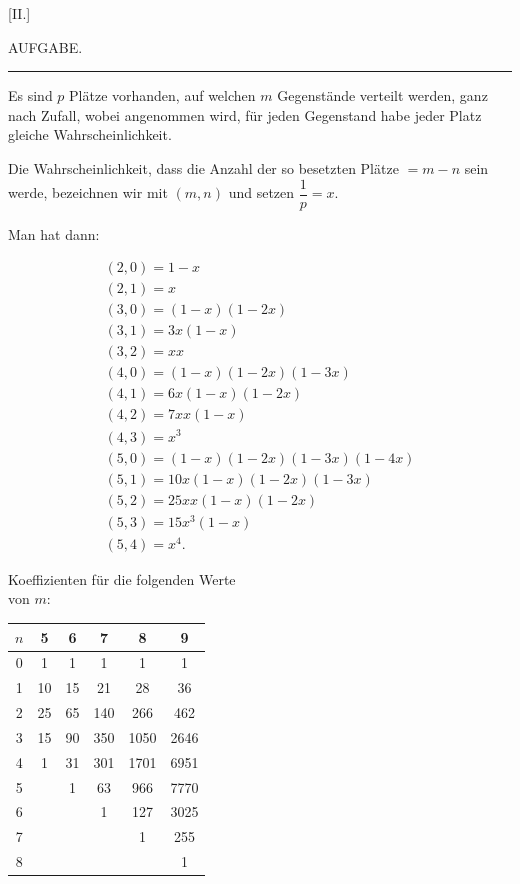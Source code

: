 \clearpage
{}
\begin{center}
[II.]
\end{center}

\begin{center}
AUFGABE.
\end{center}

\bigskip
\hrule
\bigskip

Es sind $p$ Plätze vorhanden, auf welchen $m$ Gegenstände verteilt werden,
ganz nach Zufall, wobei angenommen wird, für jeden Gegenstand habe jeder
Platz gleiche Wahrscheinlichkeit.

Die Wahrscheinlichkeit, dass die Anzahl der so besetzten Plätze $= m-n$
sein werde, bezeichnen wir mit $(m,n)$ und setzen $\dfrac{1}{p}=x$.


Man hat dann:

\[
\begin{array}{l}
(2,0) = 1-x \\
(2,1) = x \\
(3,0) = (1-x)(1-2x) \\
(3,1) = 3x(1-x) \\
(3,2) = xx \\
(4,0) = (1-x)(1-2x)(1-3x) \\
(4,1) = 6x(1-x)(1-2x) \\
(4,2) = 7xx(1-x) \\
(4,3) = x^3 \\
(5,0) = (1-x)(1-2x)(1-3x)(1-4x) \\
(5,1) = 10x(1-x)(1-2x)(1-3x) \\
(5,2) = 25xx(1-x)(1-2x) \\
(5,3) = 15x^3(1-x) \\
(5,4) = x^4.
\end{array}
\]
\begin{center}
Koeffizienten für die folgenden Werte\\
von $m$:

\smallskip
\begin{tabular}{c||c|c|c|c|c}
$n$ & 5 & 6 & 7 & 8 & 9 \\ \hline\hline
0 & 1 & 1 & 1 & 1 & 1 \\ \hline
1 & 10 & 15 & 21 & 28 & 36 \\ \hline
2 & 25 & 65 & 140 & 266 & 462 \\ \hline
3 & 15 & 90 & 350 & 1050 & 2646 \\ \hline
4 & 1 & 31 & 301 & 1701 & 6951 \\ \hline
5 & & 1 & 63 & 966 & 7770 \\ \hline
6 & & & 1 & 127 & 3025 \\ \hline
7 & & & & 1 & 255 \\ \hline
8 & & & & & 1 \\
\end{tabular}

\end{center}
